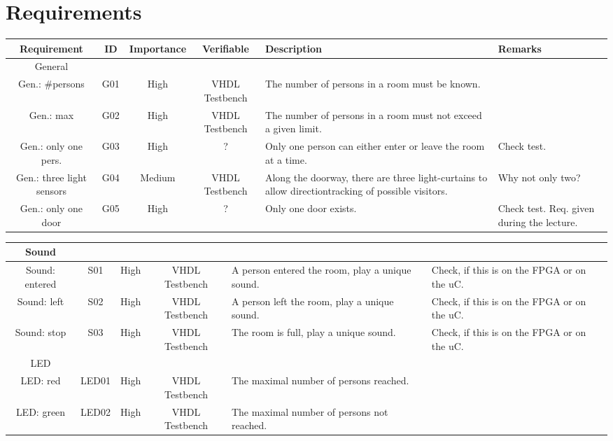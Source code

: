 \documentclass[12pt,a4 paper] {article}
\begin{document}
\section{Requirements}
\begin{center}
	\begin{tabular}{ |c|c|c|c|p{2cm}|p{2cm}| } 
		\hline
		Requirement& ID & Importance& Verifiable& Description& Remarks \\
		\hline
		General & & & & &\\
		\hline
		Gen.: \#persons& G01 &  High &  VHDL Testbench & The number of persons in a room must be known. & \\
		\hline
		Gen.: max & G02 & High &  VHDL Testbench & The number of persons in a room must not exceed a given limit. & \\
		\hline
		Gen.: only one pers. & G03 & High & ? & Only one person can either enter or leave the room at a time. & Check test. \\
		\hline
		Gen.: three light sensors & G04 & Medium & VHDL Testbench & Along the doorway, there are three light-curtains to allow directiontracking of possible visitors.& Why not only two? \\
		\hline
		Gen.: only one door & G05 & High & ? & Only one door exists.&  Check test. Req. given during the lecture. \\
		\hline
	\end{tabular}
\end{center}
\begin{center}
	\begin{tabular}{ |c|c|c|c|p{2cm}|p{2cm}| } 
		\hline
		Sound & & & & & \\
		\hline
		Sound: entered & S01 & High & VHDL Testbench & A person entered the room, play a unique sound. & Check, if this is on the FPGA or on the uC.\\
		\hline
		Sound: left & S02 & High & VHDL Testbench & A person left the room, play a unique sound. & Check, if this is on the FPGA or on the uC.\\
		\hline
		Sound: stop & S03 & High & VHDL Testbench & The room is full, play a unique sound. & Check, if this is on the FPGA or on the uC.\\
		\hline
		LED & & & & & \\
		\hline
		LED: red & LED01 &  High & VHDL Testbench & The maximal number of persons reached. & \\
		\hline
		LED: green & LED02 & High & VHDL Testbench & The maximal number of persons not reached. & \\
		\hline
	\end{tabular}
\end{center}
\end{document}
